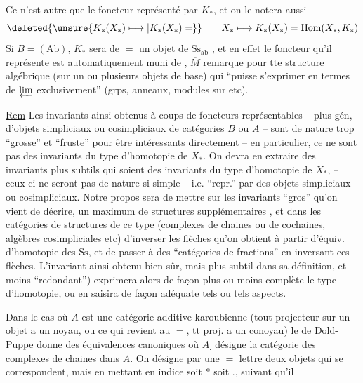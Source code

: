Ce n'est autre que le foncteur représenté par $K_*$, et on le notera aussi
\[
 \deleted{\unsure{K_*(X_*)\longmapsto|K_*(X_*)=}}\qquad
 X_*\longmapsto K_*(X_*)=\mathrm{Hom}(X_*,K_*)
\]
Si $B=(\mathrm{Ab})$, $K_*$ sera de $=$ un objet de $\mathrm{Ss}_{\mathrm{ab}}$ , et en effet le foncteur qu'il représente est automatiquement muni de   , $\overline{M}$ remarque pour tte structure algébrique (sur un ou plusieurs objets de base) qui ``puisse s'exprimer en termes de $\varprojlim$ exclusivement'' (grps,  anneaux, modules sur  etc).

\uline{Rem} Les  invariants ainsi obtenus à coups de foncteurs représentables -- plus gén, d'objets simpliciaux ou cosimpliciaux de catégories $B$ ou $A$ -- sont de nature trop ``grosse'' et ``fruste'' pour être intéressants directement --  en particulier, ce ne sont pas des invariants du type d'homotopie de $X_*$. On devra en extraire des invariants plus subtils qui soient des invariants du type d'homotopie de $X_*$, -- ceux-ci ne seront pas de nature si simple -- i.e. ``repr.'' par des objets simpliciaux ou cosimpliciaux. Notre propos sera de mettre sur les invariants ``gros'' qu'on vient de décrire, un maximum de structures supplémentaires , et dans les catégories de structures de ce type (complexes de chaines ou de cochaines, algèbres cosimpliciales etc) d'inverser les flèches qu'on obtient à partir d'équiv. d'homotopie des $\mathrm{Ss}$, et de passer à des ``catégories de fractions'' en inversant ces flèches. L'invariant ainsi obtenu   bien sûr, mais plus subtil dans sa définition, et moins ``redondant'') exprimera alors de façon plus ou moins complète le type d'homotopie, ou en saisira de façon adéquate tels ou tels aspects.

Dans le cas où $A$ est une catégorie additive karoubienne (tout projecteur sur un objet a un noyau, ou ce qui revient au $=$, tt proj. a un conoyau) le  de Dold-Puppe donne des équivalences canoniques
où $A_.$ désigne la catégorie des \uline{complexes de chaines} dans $A$. On désigne par une $=$ lettre  deux objets qui se correspondent, mais en mettant en indice soit $*$ soit $.$, suivant qu'il
